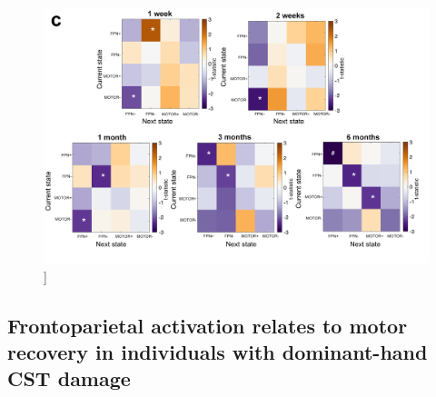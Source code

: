 \documentclass[phd,tocprelim]{cornell}
\renewcommand{\caption}[1]{\singlespacing\hangcaption{#1}\normalspacing}
\begin{document}
\null
\vfill
\clearpage    
    \null
\vfill
\begin{figure}[h!]
		\ContinuedFloat
		\captionsetup{labelformat=adja-page}
    \centering
    \includegraphics[width=1\textwidth]{chapter2/Figure4c.png}
    \caption[]{}
\end{figure}
\null
\vfill



    \subsection{Frontoparietal activation relates to motor recovery in individuals with dominant-hand CST damage}
    
\end{document}
